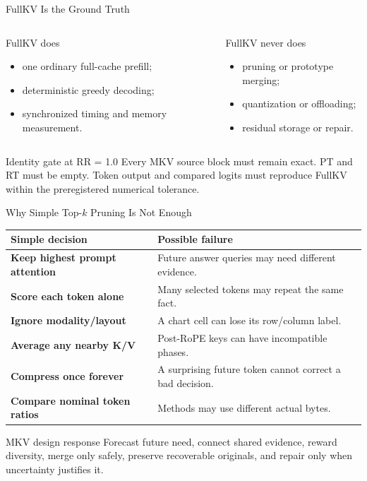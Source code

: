 \documentclass[aspectratio=169,10pt]{beamer}
\newcommand{\tightitems}{\setlength{\itemsep}{0.28em}\setlength{\parskip}{0pt}}
\begin{document}
\begin{frame}{FullKV Is the Ground Truth}
\small
\begin{columns}[T,onlytextwidth]
\begin{block}{FullKV does}
\begin{itemize}\tightitems
  \item one ordinary full-cache prefill;
  \item deterministic greedy decoding;
  \item synchronized timing and memory measurement.
\end{itemize}
\end{block}
\begin{alertblock}{FullKV never does}
\begin{itemize}\tightitems
  \item pruning or prototype merging;
  \item quantization or offloading;
  \item residual storage or repair.
\end{itemize}
\end{alertblock}
\end{columns}
\vspace{0.5em}
\begin{exampleblock}{Identity gate at RR = 1.0}
Every MKV source block must remain exact. PT and RT must be empty. Token output and compared logits
must reproduce FullKV within the preregistered numerical tolerance.
\end{exampleblock}
\end{frame}

\begin{frame}{Why Simple Top-$k$ Pruning Is Not Enough}
\small
\begin{tabularx}{\textwidth}{>{\bfseries}p{}X}
\toprule
Simple decision & Possible failure \\
\midrule
Keep highest prompt attention & Future answer queries may need different evidence. \\
Score each token alone & Many selected tokens may repeat the same fact. \\
Ignore modality/layout & A chart cell can lose its row/column label. \\
Average any nearby K/V & Post-RoPE keys can have incompatible phases. \\
Compress once forever & A surprising future token cannot correct a bad decision. \\
Compare nominal token ratios & Methods may use different actual bytes. \\
\bottomrule
\end{tabularx}
\begin{alertblock}{MKV design response}
Forecast future need, connect shared evidence, reward diversity, merge only safely, preserve
recoverable originals, and repair only when uncertainty justifies it.
\end{alertblock}
\end{frame}
\end{document}
